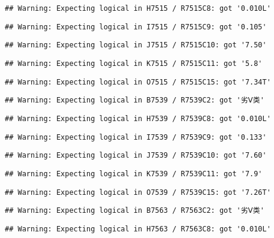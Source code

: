 \documentclass[
]{article}
\begin{document}
\begin{verbatim}
## Warning: Expecting logical in H7515 / R7515C8: got '0.010L'
\end{verbatim}

\begin{verbatim}
## Warning: Expecting logical in I7515 / R7515C9: got '0.105'
\end{verbatim}

\begin{verbatim}
## Warning: Expecting logical in J7515 / R7515C10: got '7.50'
\end{verbatim}

\begin{verbatim}
## Warning: Expecting logical in K7515 / R7515C11: got '5.8'
\end{verbatim}

\begin{verbatim}
## Warning: Expecting logical in O7515 / R7515C15: got '7.34T'
\end{verbatim}

\begin{verbatim}
## Warning: Expecting logical in B7539 / R7539C2: got '劣Ⅴ类'
\end{verbatim}

\begin{verbatim}
## Warning: Expecting logical in H7539 / R7539C8: got '0.010L'
\end{verbatim}

\begin{verbatim}
## Warning: Expecting logical in I7539 / R7539C9: got '0.133'
\end{verbatim}

\begin{verbatim}
## Warning: Expecting logical in J7539 / R7539C10: got '7.60'
\end{verbatim}

\begin{verbatim}
## Warning: Expecting logical in K7539 / R7539C11: got '7.9'
\end{verbatim}

\begin{verbatim}
## Warning: Expecting logical in O7539 / R7539C15: got '7.26T'
\end{verbatim}

\begin{verbatim}
## Warning: Expecting logical in B7563 / R7563C2: got '劣Ⅴ类'
\end{verbatim}

\begin{verbatim}
## Warning: Expecting logical in H7563 / R7563C8: got '0.010L'
\end{verbatim}
\end{document}
